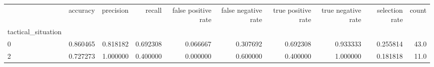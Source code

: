 \begin{tabular}{lrrrrrrrrr}
\toprule
{} &  accuracy &  precision &    recall &  false positive rate &  false negative rate &  true positive rate &  true negative rate &  selection rate &  count \\
tactical\_situation &           &            &           &                      &                      &                     &                     &                 &        \\
\midrule
0                  &  0.860465 &   0.818182 &  0.692308 &             0.066667 &             0.307692 &            0.692308 &            0.933333 &        0.255814 &   43.0 \\
2                  &  0.727273 &   1.000000 &  0.400000 &             0.000000 &             0.600000 &            0.400000 &            1.000000 &        0.181818 &   11.0 \\
\bottomrule
\end{tabular}

